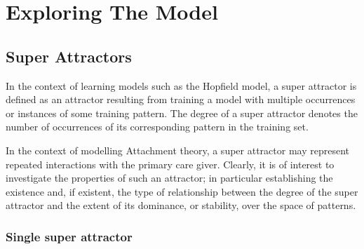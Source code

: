 \chapter{Exploring The Model}

\section{Super Attractors}
In the context of learning models such as the Hopfield model, a super attractor is defined as an attractor resulting from training a model with multiple occurrences or instances of some training pattern. The degree of a super attractor denotes the number of occurrences of its corresponding pattern in the training set.


In the context of modelling Attachment theory, a super attractor may represent repeated interactions with the primary care giver. Clearly, it is of interest to investigate the properties of such an attractor; in particular establishing the existence and, if existent, the type of relationship between the degree of the super attractor and the extent of its dominance, or stability, over the space of patterns.


\subsection{Single super attractor}

